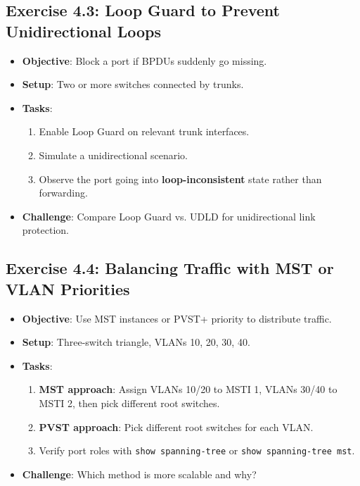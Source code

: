 \documentclass[a4paper]{report}
\begin{document}
\subsection*{Exercise 4.3: Loop Guard to Prevent Unidirectional Loops}
\begin{itemize}
    \item \textbf{Objective}: Block a port if BPDUs suddenly go missing.
    \item \textbf{Setup}: Two or more switches connected by trunks.
    \item \textbf{Tasks}:
    \begin{enumerate}
        \item Enable Loop Guard on relevant trunk interfaces.
        \item Simulate a unidirectional scenario.
        \item Observe the port going into \textbf{loop-inconsistent} state rather than forwarding.
    \end{enumerate}
    \item \textbf{Challenge}: Compare Loop Guard vs. UDLD for unidirectional link protection.
\end{itemize}

\subsection*{Exercise 4.4: Balancing Traffic with MST or VLAN Priorities}
\begin{itemize}
    \item \textbf{Objective}: Use MST instances or PVST+ priority to distribute traffic.
    \item \textbf{Setup}: Three-switch triangle, VLANs 10, 20, 30, 40.
    \item \textbf{Tasks}:
    \begin{enumerate}
        \item \textbf{MST approach}: Assign VLANs 10/20 to MSTI 1, VLANs 30/40 to MSTI 2, then pick different root switches.
        \item \textbf{PVST approach}: Pick different root switches for each VLAN.
        \item Verify port roles with \texttt{show spanning-tree} or \texttt{show spanning-tree mst}.
    \end{enumerate}
    \item \textbf{Challenge}: Which method is more scalable and why?
\end{itemize}
\end{document}
